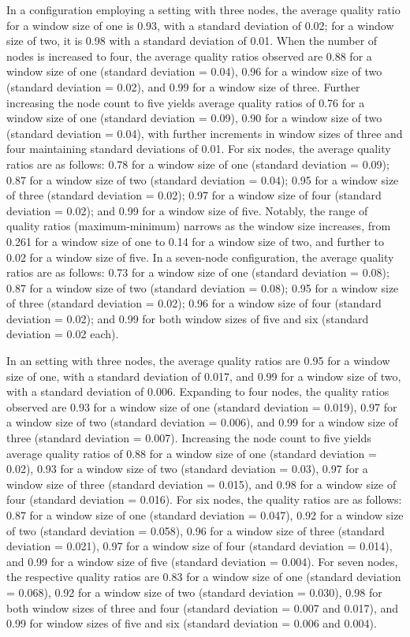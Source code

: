 In a configuration employing a \wide setting with three nodes, the average quality ratio for a window size of one is 0.93, with a standard deviation of 0.02; for a window size of two, it is 0.98 with a standard deviation of 0.01. When the number of nodes is increased to four, the average quality ratios observed are 0.88 for a window size of one (standard deviation = 0.04), 0.96 for a window size of two (standard deviation = 0.02), and 0.99 for a window size of three. Further increasing the node count to five yields average quality ratios of 0.76 for a window size of one (standard deviation = 0.09), 0.90 for a window size of two (standard deviation = 0.04), with further increments in window sizes of three and four maintaining standard deviations of 0.01.
For six nodes, the average quality ratios are as follows: 0.78 for a window size of one (standard deviation = 0.09); 0.87 for a window size of two (standard deviation = 0.04); 0.95 for a window size of three (standard deviation = 0.02); 0.97 for a window size of four (standard deviation = 0.02); and 0.99 for a window size of five. Notably, the range of quality ratios (maximum-minimum) narrows as the window size increases, from 0.261 for a window size of one to 0.14 for a window size of two, and further to 0.02 for a window size of five.
In a seven-node configuration, the average quality ratios are as follows: 0.73 for a window size of one (standard deviation = 0.08); 0.87 for a window size of two (standard deviation = 0.08); 0.95 for a window size of three (standard deviation = 0.02); 0.96 for a window size of four (standard deviation = 0.02); and 0.99 for both window sizes of five and six (standard deviation = 0.02 each).

In an \average setting with three nodes, the average quality ratios are 0.95 for a window size of one, with a standard deviation of 0.017, and 0.99 for a window size of two, with a standard deviation of 0.006. Expanding to four nodes, the quality ratios observed are 0.93 for a window size of one (standard deviation = 0.019), 0.97 for a window size of two (standard deviation = 0.006), and 0.99 for a window size of three (standard deviation = 0.007). Increasing the node count to five yields average quality ratios of 0.88 for a window size of one (standard deviation = 0.02), 0.93 for a window size of two (standard deviation = 0.03), 0.97 for a window size of three (standard deviation = 0.015), and 0.98 for a window size of four (standard deviation = 0.016).
For six nodes, the quality ratios are as follows: 0.87 for a window size of one (standard deviation = 0.047), 0.92 for a window size of two (standard deviation = 0.058), 0.96 for a window size of three (standard deviation = 0.021), 0.97 for a window size of four (standard deviation = 0.014), and 0.99 for a window size of five (standard deviation = 0.004). For seven nodes, the respective quality ratios are 0.83 for a window size of one (standard deviation = 0.068), 0.92 for a window size of two (standard deviation = 0.030), 0.98 for both window sizes of three and four (standard deviation = 0.007 and 0.017), and 0.99 for window sizes of five and six (standard deviation = 0.006 and 0.004).


